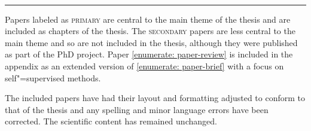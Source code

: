 \vspace{5mm}

\raggedright\par\noindent\hspace{8mm}{\Large\scshape secondary}\\[-2mm]

\raggedleft\rule{\textwidth - 8mm}{0.4pt}

\begin{enumerate}[leftmargin=8mm,topsep=0mm,label={[\Alph*]}]
    \setcounter{enumi}{3}
    \item {} \shared \label{enumerate: paper-review}
    \item {} \co
    \item {} \co %
\end{enumerate}

\justifying

\vspace{5mm}

\noindent Papers labeled as \textsc{primary} are central to the main theme of the thesis and are included as chapters of the thesis. 
The \textsc{secondary} papers are less central to the main theme and so are not included in the thesis, although they were published as part of the PhD project. 
Paper \ref{enumerate: paper-review} is included in the appendix as an extended version of \ref{enumerate: paper-brief} with a focus on self"=supervised methods. 

\vspace{3mm}

\noindent The included papers have had their layout and formatting adjusted to conform to that of the thesis and any spelling and minor language errors have been corrected. The scientific content has remained unchanged.

\vspace*{\fill}
